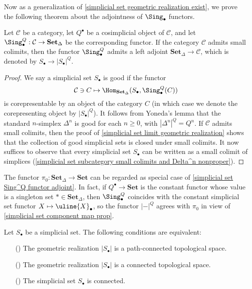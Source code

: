 Now as a generalization of \cref{simplicial set geometric realization exist}, we prove the following theorem about the adjointness of $\Sing_\bullet$ functors.
\begin{proposition}\label{simplicial set Sing^Q functor adjoint}
Let $\mathcal{C}$ be a category, let $Q^\bullet$ be a cosimplicial object of $\mathcal{C}$, and let $\Sing_\bullet^Q:\mathcal{C}\to\mathbf{Set}_\Delta$ be the corresponding functor. If the category $\mathcal{C}$ admits small colimits, then the functor $\Sing_\bullet^Q$ admits a left adjoint $\mathbf{Set}_\Delta\to\mathcal{C}$, which is denoted by $S_\bullet\to|S_\bullet|^Q$.
\end{proposition}
\begin{proof}
We say a simplicial set $S_\bullet$ is good if the functor
\[\mathcal{C}\ni C\mapsto\Hom_{\mathbf{Set}_\Delta}(S_\bullet,\Sing_\bullet^Q(C))\]
is corepresentable by an object of the category $C$ (in which case we denote the corepresenting object by $|S_\bullet|^Q$). It follows from Yoneda's lemma that the standard $n$-simplex $\Delta^n$ is good for each $n\geq 0$, with $|\Delta^n|^Q=Q^n$. If $\mathcal{C}$ admits small colimits, then the proof of \cref{simplicial set limit geometric realization} shows that the collection of good simplicial sets is closed under small colimits. It now suffices to observe that every simplicial set $S_\bullet$ can be written as a small colimit of simplices (\cref{simplicial set subcategory small colimits and Delta^n nonproper}).
\end{proof}
\begin{example}\label{simplicial set pi_0 as geometric realization}
The functor $\pi_0:\mathbf{Set}_\Delta\to\mathbf{Set}$ can be regarded as special case of \cref{simplicial set Sing^Q functor adjoint}. In fact, if $Q^\bullet\to\mathbf{Set}$ is the constant functor whose value is a singleton set $\ast\in\mathbf{Set}_\Delta$, then $\Sing_\bullet^Q$ coincides with the constant simplicial set functor $X\mapsto\uline{X}_\bullet$, so the functor $|-|^Q$ agrees with $\pi_0$ in view of \cref{simplicial set component map prop}.
\end{example}
\begin{proposition}\label{simplicial set geometric realization connected iff}
Let $S_\bullet$ be a simplicial set. The following conditions are equivalent:
\begin{itemize}
\item[(\rmnum{1})] The geometric realization $|S_\bullet|$ is a path-connected topological space.
\item[(\rmnum{2})] The geometric realization $|S_\bullet|$ is a connected topological space.
\item[(\rmnum{3})] The simplicial set $S_\bullet$ is connected.
\end{itemize}
\end{proposition}
